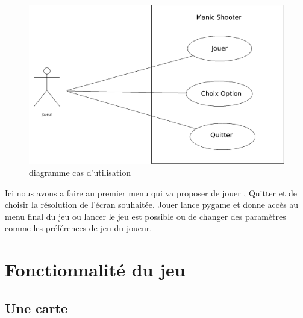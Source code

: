 \documentclass[a4paper, 11pt]{article}
\begin{document}
 \begin{figure}[ht!]
 \centering
 \includegraphics[width=1.1\linewidth]{diagfinal.png}
 \caption{diagramme cas d'utilisation}
 \label{fig::example::one}
\end{figure}

Ici nous avons a faire au premier menu qui va proposer de jouer , Quitter et de choisir la résolution de l'écran souhaitée.
Jouer lance pygame et donne accès au menu final du jeu ou lancer le jeu est possible ou de changer des paramètres comme les préférences de jeu du joueur.


\section{Fonctionnalité du jeu}


 	\subsection{Une carte}
 	
\end{document}
